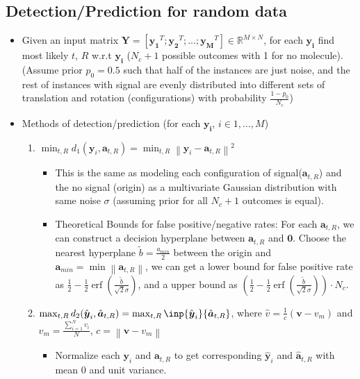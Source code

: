\documentclass[11pt]{article}
\newcommand{\by}{\boldsymbol{y}}
\newcommand{\ba}{\boldsymbol{a}}
\newcommand{\R}{\mathbb{R}}
\newcommand{\norm}[1]{\left\lVert#1\right\rVert}
\DeclareMathOperator{\erf}{erf}
\begin{document}
    \subsection{Detection/Prediction for random data}
    \begin{itemize}
        \item Given an input matrix $\mathbf{Y} = [\mathbf{y_1}^T; \mathbf{y_2}^T; ...; \mathbf{y_M}^T] \in \R^{M\times N}$, for each $\mathbf{y_i}$ find most likely $t$, $R$ w.r.t $\mathbf{y_i}$ ($N_c+1$ possible outcomes with 1 for no molecule). (Assume prior $p_0=0.5$ such that half of the instances are just noise, and the rest of instances with signal are evenly distributed into different sets of translation and rotation (configurations) with probability $\frac{1-p_0}{N_c}$)
        \item Methods of detection/prediction (for each $\mathbf{y_i}$, $i \in {1,...,M}$)
        \begin{enumerate}
        \item $\min_{t,R} d_{1}(\by_i,\mathbf{a}_{t,R}) = \min_{t, R} \norm {\by_i- \mathbf{a}_{t,R}}^2$
        \begin{itemize}
            \item This is the same as modeling each configuration of signal($\mathbf{a}_{t,R}$) and the no signal (origin) as a multivariate Gaussian distribution with same noise $\sigma$ (assuming prior for all $N_c+1$ outcomes is equal).
            \item Theoretical Bounds for false positive/negative rates: For each $\mathbf{a}_{t,R}$, we can construct a decision hyperplane between $\mathbf{a}_{t,R}$ and $\mathbf{0}$. Choose the nearest hyperplane $\widetilde{b} = \frac{a_{min}}{2}$ between the origin and $\mathbf{a}_{min} = \min{\norm { \mathbf{a}_{t,R}}}$, we can get a lower bound for false positive rate as $\frac{1}{2} - \frac{1}{2} \erf(\frac{\widetilde{b}}{\sqrt{2}\sigma})$, and a upper bound as $(\frac{1}{2} - \frac{1}{2} \erf(\frac{\widetilde{b}}{\sqrt{2}\sigma}))\cdot N_c$.
        \end{itemize}
        \item $\max_{t,R} d_{2}(\hat{\by}_i, \hat{\ba}_{t,R}) = \max_{t,R} \inp {\hat{\by}_i} {\hat{\ba}_{t,R}}$, where $\hat{v} = \frac{1}{c}(\mathbf{v} - v_m)$ and $v_m = \frac{\sum_{i=1}^N v_i}{N}$, $c = \norm {\mathbf{v}- v_m}$
        \begin{itemize}
            \item Normalize each $\by_i$ and $\ba_{t,R}$ to get corresponding $\hat{\by}_i$ and $\hat{\ba}_{t,R}$ with mean 0 and unit variance.

\end{itemize}
\end{enumerate}
\end{itemize}
\end{document}
